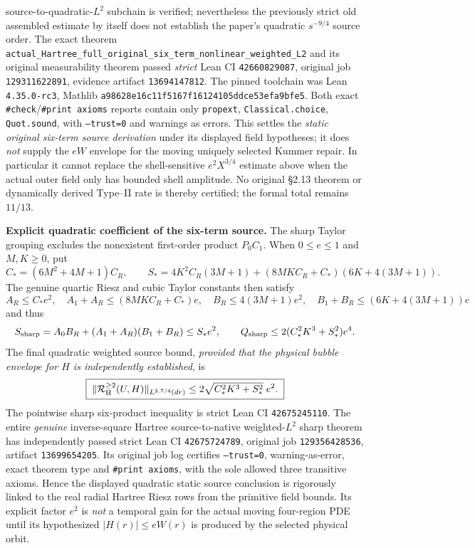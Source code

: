 \documentclass[11pt]{amsart}
\begin{document}
source-to-quadratic-$L^2$ subchain is verified; nevertheless
the previously strict old assembled estimate by itself does not
establish the paper's quadratic $s^{-9/4}$ source order.
The exact theorem
\texttt{actual\_Hartree\_full\_original\_six\_term\_nonlinear\_weighted\_L2}
and its original measurability theorem passed \emph{strict}
Lean CI \texttt{42660829087}, original job
\texttt{129311622891}, evidence artifact
\texttt{13694147812}.  The pinned toolchain was Lean
\texttt{4.35.0-rc3}, Mathlib
\texttt{a98628e16c11f5167f16124105ddce53efa9bfe5}.
Both exact \texttt{\#check}/\texttt{\#print axioms} reports
contain only \texttt{propext}, \texttt{Classical.choice},
\texttt{Quot.sound}, with \texttt{--trust=0} and warnings
as errors.  This settles the \emph{static original six-term
source derivation} under its displayed field hypotheses; it
does \emph{not} supply the $eW$ envelope for the moving
uniquely selected Kummer repair.  In particular it cannot
replace the shell-sensitive $e^2 X^{3/4}$ estimate above
when the actual outer field only has bounded shell amplitude.
No original \S2.13 theorem or dynamically derived Type--II
rate is thereby certified; the formal total remains $11/13$.



\medskip
\noindent\textbf{Explicit quadratic coefficient of the six-term source.}
The sharp Taylor grouping excludes the nonexistent first-order
product $P_0 C_1$.  When $0\le e\le1$ and $M,K\ge0$, put
\[
 C_*=(6M^2+4M+1)C_R,\qquad
 S_*=4K^2C_R(3M+1)
 +(8MKC_R+C_*)(6K+4(3M+1)).
\]
The genuine quartic Riesz and cubic Taylor constants then satisfy
\[
 A_R\le C_*e^2,\quad
 A_1+A_R\le(8MKC_R+C_*)e,\quad
 B_R\le4(3M+1)e^2,\quad
 B_1+B_R\le(6K+4(3M+1))e
\]
and thus
\[
 S_{\rm sharp}=A_0B_R+(A_1+A_R)(B_1+B_R)\le S_*e^2,
 \qquad
 Q_{\rm sharp}\le 2(C_*^2K^3+S_*^2)e^4.
\]
The final quadratic weighted source bound, \emph{provided that the
physical bubble envelope for $H$ is independently established}, is
\[
 \boxed{\;
 \|\mathcal R_{\rm H}^{\ge2}(U,H)\|_{L^{2,7/4}(dr)}
 \le 2\sqrt{C_*^2K^3+S_*^2}\;e^2 .
 \;}
\]
The pointwise sharp six-product inequality is strict Lean
CI \texttt{42675245110}.  The entire \emph{genuine} inverse-square
Hartree source-to-native weighted-$L^2$ sharp theorem has independently
passed strict Lean CI \texttt{42675724789}, original job
\texttt{129356428536}, artifact \texttt{13699654205}.
Its original job log certifies \texttt{--trust=0}, warning-as-error,
exact theorem type and \texttt{\#print axioms}, with the sole allowed
three transitive axioms.  Hence the displayed quadratic static
source conclusion is rigorously linked to the real radial Hartree
Riesz rows from the primitive field bounds.
Its explicit factor $e^2$ is \emph{not} a temporal gain for
the actual moving four-region PDE until its hypothesized
$|H(r)|\le eW(r)$ is produced by the selected physical orbit.
\end{document}
